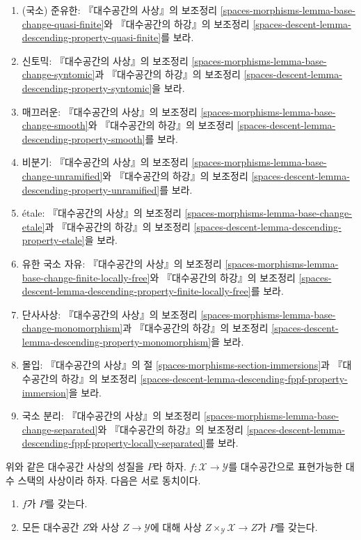\begin{enumerate}
『대수공간의 하강』의 보조정리
\ref{spaces-descent-lemma-descending-property-finite}를 보라.
\item (국소) 준유한: 『대수공간의 사상』의 보조정리
\ref{spaces-morphisms-lemma-base-change-quasi-finite}와
『대수공간의 하강』의 보조정리
\ref{spaces-descent-lemma-descending-property-quasi-finite}를 보라.
\item 신토믹: 『대수공간의 사상』의 보조정리
\ref{spaces-morphisms-lemma-base-change-syntomic}과
『대수공간의 하강』의 보조정리
\ref{spaces-descent-lemma-descending-property-syntomic}을 보라.
\item 매끄러운: 『대수공간의 사상』의 보조정리
\ref{spaces-morphisms-lemma-base-change-smooth}와
『대수공간의 하강』의 보조정리
\ref{spaces-descent-lemma-descending-property-smooth}를 보라.
\item 비분기: 『대수공간의 사상』의 보조정리
\ref{spaces-morphisms-lemma-base-change-unramified}와
『대수공간의 하강』의 보조정리
\ref{spaces-descent-lemma-descending-property-unramified}를 보라.
\item \'etale: 『대수공간의 사상』의 보조정리
\ref{spaces-morphisms-lemma-base-change-etale}과
『대수공간의 하강』의 보조정리
\ref{spaces-descent-lemma-descending-property-etale}을 보라.
\item 유한 국소 자유: 『대수공간의 사상』의 보조정리
\ref{spaces-morphisms-lemma-base-change-finite-locally-free}와
『대수공간의 하강』의 보조정리
\ref{spaces-descent-lemma-descending-property-finite-locally-free}를 보라.
\item 단사사상: 『대수공간의 사상』의 보조정리
\ref{spaces-morphisms-lemma-base-change-monomorphism}과
『대수공간의 하강』의 보조정리
\ref{spaces-descent-lemma-descending-property-monomorphism}을 보라.
\item 몰입: 『대수공간의 사상』의 절
\ref{spaces-morphisms-section-immersions}과
『대수공간의 하강』의 보조정리
\ref{spaces-descent-lemma-descending-fppf-property-immersion}을 보라.
\item 국소 분리: 『대수공간의 사상』의 보조정리
\ref{spaces-morphisms-lemma-base-change-separated}와
『대수공간의 하강』의 보조정리
\ref{spaces-descent-lemma-descending-fppf-property-locally-separated}를 보라.
\end{enumerate}

\begin{lemma}
\label{lemma-property-spaces-too}
위와 같은 대수공간 사상의 성질을 $P$라 하자.
$f : \mathcal{X} \to \mathcal{Y}$를 대수공간으로 표현가능한
대수 스택의 사상이라 하자. 다음은 서로 동치이다.
\begin{enumerate}
\item $f$가 $P$를 갖는다.
\item 모든 대수공간 $Z$와 사상 $Z \to \mathcal{Y}$에 대해 사상
$Z \times_\mathcal{Y} \mathcal{X} \to Z$가 $P$를 갖는다.
\end{enumerate}
\end{lemma}

